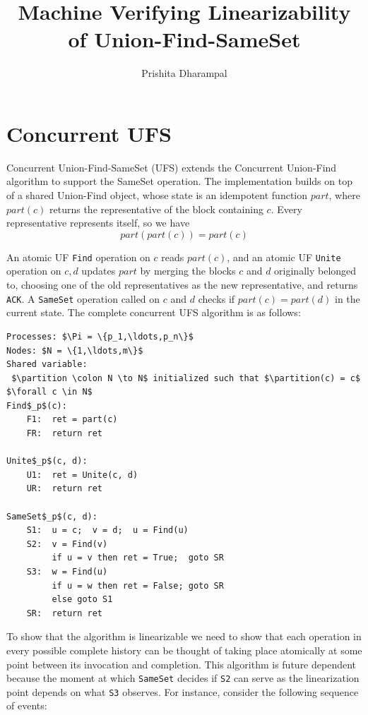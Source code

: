 \documentclass[12pt]{amsproc}
\begin{document}
\title{Machine Verifying Linearizability of Union-Find-SameSet}

\author{Prishita Dharampal}
\date{}
\maketitle
\vspace{-0.3in}

\newcommand{\partition}{\mathit{part}}
\newcommand{\Find}{\texttt{Find}}
\newcommand{\Unite}{\texttt{Unite}}
\newcommand{\SameSet}{\texttt{SameSet}}
\newcommand{\False}{\texttt{False{}}}
\newcommand{\True}{\texttt{True{}}}


\section{Concurrent UFS}

Concurrent Union-Find-SameSet (UFS) extends the Concurrent Union-Find algorithm to support the SameSet operation. The implementation builds on top of a shared Union-Find object, whose state is an idempotent function $\partition$, where $\partition(c)$ returns the representative of the block containing $c$. Every representative represents itself, so we have
\[\partition(\partition(c)) = \partition(c)\]

An atomic UF \Find{} operation on $c$ reads $\partition(c)$, and an atomic UF \Unite{} operation on $c, d$ updates $\partition$ by merging the blocks $c$ and $d$ originally belonged to, choosing one of the old representatives as the new representative, and returns \texttt{ACK}. A \SameSet{} operation called on $c$ and $d$ checks if $\partition(c) = \partition(d)$ in the current state. The complete concurrent UFS algorithm is as follows: 
\begin{lstlisting}[mathescape]
Processes: $\Pi = \{p_1,\ldots,p_n\}$
Nodes: $N = \{1,\ldots,m\}$
Shared variable: 
 $\partition \colon N \to N$ initialized such that $\partition(c) = c$ $\forall c \in N$
Find$_p$(c):
    F1:  ret = part(c)
    FR:  return ret

Unite$_p$(c, d):
    U1:  ret = Unite(c, d)
    UR:  return ret

SameSet$_p$(c, d):
    S1:  u = c;  v = d;  u = Find(u)
    S2:  v = Find(v)
         if u = v then ret = True;  goto SR
    S3:  w = Find(u)
         if u = w then ret = False; goto SR
         else goto S1
    SR:  return ret
\end{lstlisting}
To show that the algorithm is linearizable we need to show that each operation in every possible complete history can be thought of taking place atomically at some point between its invocation and completion. This algorithm is future dependent because the moment at which \SameSet{} decides if \texttt{S2} can serve as the linearization point depends on what \texttt{S3} observes. For instance, consider the following sequence of events: 
\end{document}
